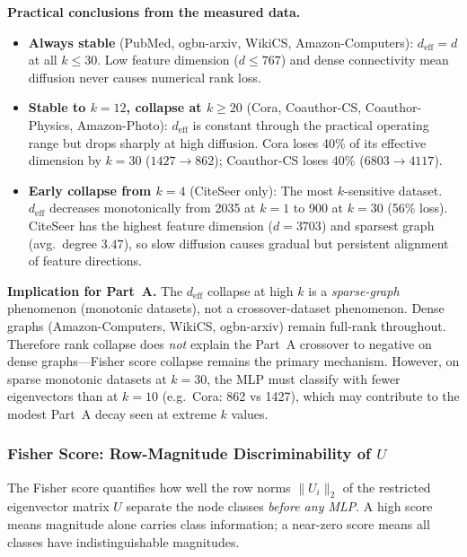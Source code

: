 \documentclass[11pt]{article}
\begin{document}
\textbf{Practical conclusions from the measured data.}
\begin{itemize}
  \item \textbf{Always stable} (PubMed, ogbn-arxiv, WikiCS, Amazon-Computers):
    $d_{\mathrm{eff}} = d$ at all $k \leq 30$.  Low feature dimension ($d \leq 767$)
    and dense connectivity mean diffusion never causes numerical rank loss.
  \item \textbf{Stable to $k{=}12$, collapse at $k \geq 20$}
    (Cora, Coauthor-CS, Coauthor-Physics, Amazon-Photo):
    $d_{\mathrm{eff}}$ is constant through the practical operating range but drops
    sharply at high diffusion.  Cora loses 40\% of its effective dimension by $k{=}30$
    ($1427 \to 862$); Coauthor-CS loses 40\% ($6803 \to 4117$).
  \item \textbf{Early collapse from $k{=}4$} (CiteSeer only):
    The most $k$-sensitive dataset.  $d_{\mathrm{eff}}$ decreases monotonically from
    2035 at $k{=}1$ to 900 at $k{=}30$ (56\% loss).  CiteSeer has the highest feature
    dimension ($d{=}3703$) and sparsest graph (avg.\ degree $3.47$), so slow diffusion
    causes gradual but persistent alignment of feature directions.
\end{itemize}

\textbf{Implication for Part~A.}
The $d_{\mathrm{eff}}$ collapse at high $k$ is a \emph{sparse-graph} phenomenon
(monotonic datasets), not a crossover-dataset phenomenon.
Dense graphs (Amazon-Computers, WikiCS, ogbn-arxiv) remain full-rank throughout.
Therefore rank collapse does \emph{not} explain the Part~A crossover to negative
on dense graphs---Fisher score collapse remains the primary mechanism.
However, on sparse monotonic datasets at $k{=}30$, the MLP must classify with fewer
eigenvectors than at $k{=}10$ (e.g.\ Cora: 862 vs 1427), which may contribute to
the modest Part~A decay seen at extreme $k$ values.

\subsubsection*{Fisher Score: Row-Magnitude Discriminability of $U$}

The Fisher score quantifies how well the row norms $\|U_i\|_2$ of the restricted
eigenvector matrix $U$ separate the node classes \emph{before any MLP}.
A high score means magnitude alone carries class information;
a near-zero score means all classes have indistinguishable magnitudes.
\end{document}
